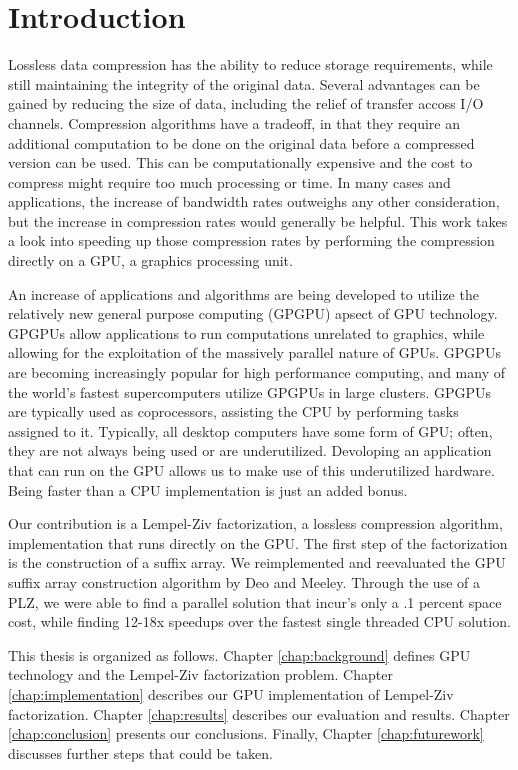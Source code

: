 \chapter{Introduction}
Lossless data compression has the ability to reduce storage requirements, while still maintaining the integrity of the original data.
Several advantages can be gained by reducing the size of data, including the relief of transfer accoss I/O channels.
Compression algorithms have a tradeoff, in that they require an additional computation to be done on the original data before a compressed version can be used.
This can be computationally expensive and the cost to compress might require too much processing or time.
In many cases and applications, the increase of bandwidth rates outweighs any other consideration, but the increase in compression rates would generally be helpful.
This work takes a look into speeding up those compression rates by performing the compression directly on a GPU, a graphics processing unit.

An increase of applications and algorithms are being developed to utilize the relatively new general purpose computing (GPGPU) apsect of GPU technology.
GPGPUs allow applications to run computations unrelated to graphics, while allowing for the exploitation of the massively parallel nature of GPUs.
GPGPUs are becoming increasingly popular for high performance computing, and many of the world's fastest supercomputers utilize GPGPUs in large clusters.
GPGPUs are typically used as coprocessors, assisting the CPU by performing tasks assigned to it.
Typically, all desktop computers have some form of GPU; often, they are not always being used or are underutilized.
Devoloping an application that can run on the GPU allows us to make use of this underutilized hardware.
Being faster than a CPU implementation is just an added bonus.


Our contribution is a Lempel-Ziv factorization, a lossless compression algorithm, implementation that runs directly on the GPU.
The first step of the factorization is the construction of a suffix array.
We reimplemented and reevaluated the GPU suffix array construction algorithm by Deo and Meeley\cite{Deo}.
Through the use of a PLZ, we were able to find a parallel solution that incur's only a .1 percent space cost, while finding 12-18x speedups over the fastest single threaded CPU solution.

This thesis is organized as follows.
Chapter \ref{chap:background} defines GPU technology and the Lempel-Ziv factorization problem.
Chapter \ref{chap:implementation} describes our GPU implementation of Lempel-Ziv factorization.
Chapter \ref{chap:results} describes our evaluation and results.
Chapter \ref{chap:conclusion} presents our conclusions.
Finally, Chapter \ref{chap:futurework} discusses further steps that could be taken.
